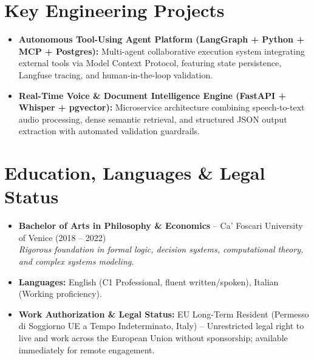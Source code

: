 \documentclass[a4paper,10pt]{article}
\begin{document}
\section{Key Engineering Projects}
\begin{itemize}
  \item \textbf{Autonomous Tool-Using Agent Platform (LangGraph + Python + MCP + Postgres):} Multi-agent collaborative execution system integrating external tools via Model Context Protocol, featuring state persistence, Langfuse tracing, and human-in-the-loop validation.
  \item \textbf{Real-Time Voice \& Document Intelligence Engine (FastAPI + Whisper + pgvector):} Microservice architecture combining speech-to-text audio processing, dense semantic retrieval, and structured JSON output extraction with automated validation guardrails.
\end{itemize}

\section{Education, Languages \& Legal Status}
\begin{itemize}
  \item \textbf{Bachelor of Arts in Philosophy \& Economics} -- Ca' Foscari University of Venice (2018 -- 2022) \\
  \textit{Rigorous foundation in formal logic, decision systems, computational theory, and complex systems modeling.}
  \item \textbf{Languages:} English (C1 Professional, fluent written/spoken), Italian (Working proficiency).
  \item \textbf{Work Authorization \& Legal Status:} EU Long-Term Resident (Permesso di Soggiorno UE a Tempo Indeterminato, Italy) -- Unrestricted legal right to live and work across the European Union without sponsorship; available immediately for remote engagement.
\end{itemize}
\end{document}
